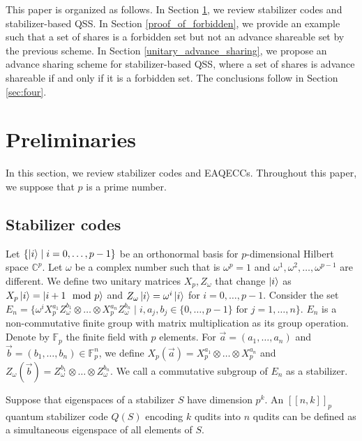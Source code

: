 \documentclass[11pt,a4paper]{article}
\theoremstyle{definition}
\begin{document}
This paper is organized as follows.
In Section \ref{sec:2}, we review stabilizer codes and stabilizer-based QSS. 
In Section \ref{proof_of_forbidden}, we provide an example such that a set of shares is a forbidden set but not an advance shareable set by the previous scheme. 
In Section \ref{unitary_advance_sharing}, we propose an advance sharing scheme for stabilizer-based QSS, where 
a set of shares is advance shareable if and only if it is a forbidden set.
The conclusions follow in Section \ref{sec:four}.

\section{Preliminaries}\label{sec:2}
In this section, we review stabilizer codes and EAQECCs.
Throughout this paper, we suppose that $p$ is a prime number.
% 
\subsection{Stabilizer codes}
Let $\{\ket{i}\mid i=0,\dots,p-1\}$ be an orthonormal basis for $p$-dimensional Hilbert space $\mathbb{C}^p$.
Let $\omega$ be a complex number such that is $\omega^p=1$ and $\omega^1,\omega^2,\dots,\omega^{p-1}$ are different.
We define two unitary matrices $X_p,Z_\omega$ 
that change $\ket{i}$ as 
$X_p \ket{i} = \ket{i+1\mod p}$ 
and $Z_\omega\ket{i} = \omega^i\ket{i}$ for $i=0,\dots,p-1$.
Consider the set $E_n = \{\omega^iX_p^{a_1}Z_\omega^{b_1}\otimes \dots\otimes X_p^{a_n}Z_\omega^{b_n}\mid i,a_j,b_j\in\{0,\dots,p-1\}\text{ for }j = 1,\dots,n\}$.
$E_n$ is a non-commutative finite group with matrix multiplication as its group operation. 
Denote by $\mathbb{F}_p$ the finite field with $p$ elements. 
For $\vec{a}=(a_1,\dots ,a_n)$ and $\vec{b} =(b_1,\dots ,b_n)\in\mathbb{F}_p^n$, we define 
$X_p(\vec{a}) = X_p^{a_1}\otimes\dots\otimes X_p^{a_n}$ 
and $Z_\omega(\vec{b})=Z_\omega^{b_1}\otimes\dots\otimes Z_\omega^{b_n}$.
We call a commutative subgroup of $E_n$ as a stabilizer. 

Suppose that eigenspaces of a stabilizer $S$ have dimension $p^k$. 
An $[[n,k]]_p$ quantum stabilizer code $Q(S)$ encoding $k$ qudits into $n$ qudits can be defined as 
a simultaneous eigenspace of all elements of $S$.
\end{document}
